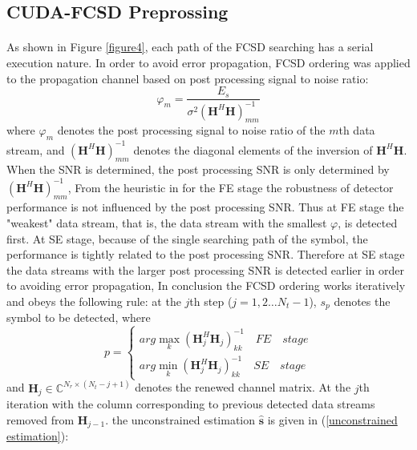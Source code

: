 \documentclass[12pt,a4paper,final]{article}
\begin{document}
\begin{spacing}{2.5}
\subsection{CUDA-FCSD Preprossing}
\paragraph{}As shown in Figure \ref{figure4}, each path of the FCSD searching has a serial execution nature. In order to avoid error propagation, FCSD ordering was applied to the propagation channel based on post processing signal to noise ratio\cite{wolniansky1998v}:
\begin{equation}
\varphi_{m}=\frac{E_{s}}{\sigma^{2}(\mathbf{H}^{H}\mathbf{H})_{mm}^{-1}}  \label{ppsnr}
\end{equation}
where $\varphi_{m}$ denotes the post processing signal to noise ratio of the $m$th data stream, and $(\mathbf{H}^{H}\mathbf{H})_{mm}^{-1}$ denotes the diagonal elements of the inversion of $\mathbf{H}^{H}\mathbf{H}$. When the SNR is determined, the post processing SNR is only determined by $(\mathbf{H}^{H}\mathbf{H})_{mm}^{-1}$, From the heuristic in \cite{barbero2008fixing} for the FE stage the robustness of detector performance is not influenced by the post processing SNR. Thus at FE stage the "weakest" data stream, that is, the data stream with the smallest $\varphi$, is detected first. At SE stage, because of the single searching path of the symbol, the performance is tightly related to the post processing SNR. Therefore at SE stage the data streams with the larger post processing SNR is detected earlier in order to avoiding error propagation, In conclusion the FCSD ordering works iteratively  and obeys the following rule:
at the $j$th step ($j=1,2\dots N_{t}-1$), $s_{p}$ denotes the symbol to be detected, where 
\begin{displaymath}
p=\left\lbrace \begin{array}{c}
arg \max_{k}(\mathbf{H}_{j}^{H}\mathbf{H}_{j})_{kk}^{-1}\quad FE\quad stage\\
arg \min_{k}(\mathbf{H}_{j}^{H}\mathbf{H}_{j})_{kk}^{-1}\quad SE\quad stage   \label{the ordering}
\end{array}\right.  
\end{displaymath}  
and $\mathbf{H}_{j}\in \mathbb{C}^{N_{r}\times (N_{t}-j+1)}$ denotes the renewed channel matrix. At the $j$th iteration with the column corresponding to previous detected data streams removed from $\mathbf{H}_{j-1}$.
the unconstrained estimation $\mathbf{\hat{s}}$  is given in (\ref{unconstrained estimation}):


\end{spacing}
\end{document}
